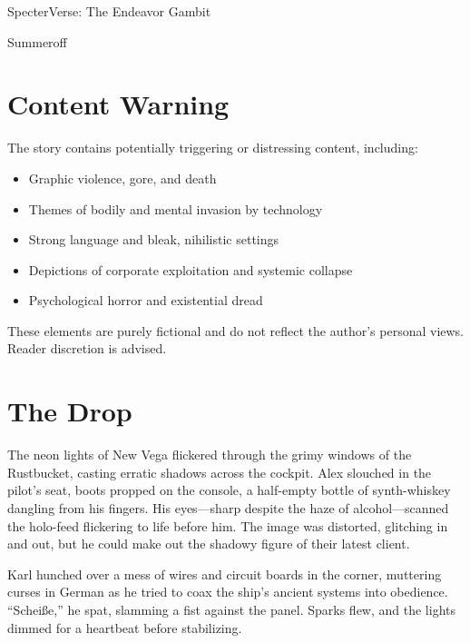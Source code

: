 \documentclass[12pt]{book}
\begin{document}
\begin{titlepage}
    \centering
    \vspace*{3cm}
    {\fontsize{48}{60}\selectfont SpecterVerse: The Endeavor Gambit\par}
    \vspace{2cm}
    {\Large Summeroff\par}
\end{titlepage}
\clearpage

\chapter*{Content Warning}
The story contains potentially triggering or distressing content, including:
\begin{itemize}
    \item Graphic violence, gore, and death
    \item Themes of bodily and mental invasion by technology
    \item Strong language and bleak, nihilistic settings
    \item Depictions of corporate exploitation and systemic collapse
    \item Psychological horror and existential dread
\end{itemize}
These elements are purely fictional and do not reflect the author’s personal views. Reader discretion is advised.
\clearpage

\tableofcontents
\clearpage

\chapter{The Drop}

The neon lights of New Vega flickered through the grimy windows of the Rustbucket, casting erratic shadows across the cockpit. Alex slouched in the pilot’s seat, boots propped on the console, a half-empty bottle of synth-whiskey dangling from his fingers. His eyes---sharp despite the haze of alcohol---scanned the holo-feed flickering to life before him. The image was distorted, glitching in and out, but he could make out the shadowy figure of their latest client.

Karl hunched over a mess of wires and circuit boards in the corner, muttering curses in German as he tried to coax the ship’s ancient systems into obedience. \enquote{Scheiße,} he spat, slamming a fist against the panel. Sparks flew, and the lights dimmed for a heartbeat before stabilizing.
\end{document}
